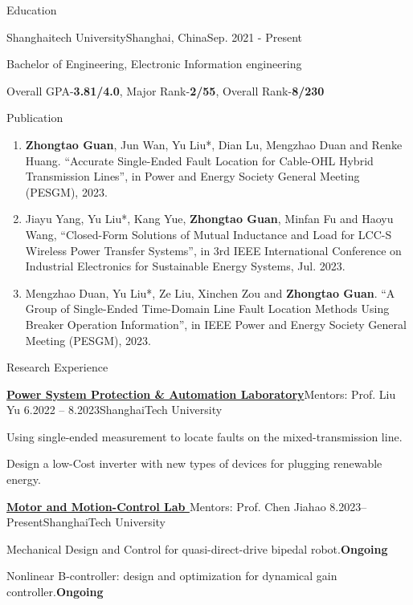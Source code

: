 \documentclass[]{ZhongtaoGuan-resume}
\begin{document}
\resumeheader
{}
{}
{}
{}
{}

\begin{section}{Education}
 \begin{subsectionnobullet}{Shanghaitech University}{Shanghai, China}{Sep. 2021 - Present}{}
     \item{Bachelor of Engineering, Electronic Information engineering}
     \item{Overall GPA-\textbf{3.81/4.0}, Major Rank-\textbf{2/55}, Overall Rank-\textbf{8/230}}
 \end{subsectionnobullet}
\end{section}

\begin{section}{Publication}
 \begin{enumerate}
     \item \textbf{Zhongtao Guan}, Jun Wan, Yu Liu*, Dian Lu, Mengzhao Duan and Renke Huang. “Accurate Single-Ended Fault Location for Cable-OHL Hybrid Transmission Lines”, in Power and Energy Society General Meeting (PESGM), 2023. %
     \item Jiayu Yang, Yu Liu*, Kang Yue, \textbf{Zhongtao Guan}, Minfan Fu and Haoyu Wang, “Closed-Form Solutions of Mutual Inductance and Load for LCC-S Wireless Power Transfer Systems”, in 3rd IEEE International Conference on Industrial Electronics for Sustainable Energy Systems, Jul. 2023.
     \item Mengzhao Duan, Yu Liu*, Ze Liu, Xinchen Zou and \textbf{Zhongtao Guan}. “A Group of Single-Ended Time-Domain Line Fault Location Methods Using Breaker Operation Information”, in IEEE Power and Energy Society General Meeting (PESGM), 2023.%
 \end{enumerate}
\end{section}

\begin{section}{Research Experience}
 \begin{subsection}{\textbf{\href{https://pspal.shanghaitech.edu.cn/}{Power System Protection \& Automation Laboratory}}}{Mentors: Prof. Liu Yu}{ 6.2022 -- 8.2023}{ShanghaiTech University}
     \item{Using single-ended measurement to locate faults on the mixed-transmission line.}
     \item{Design a low-Cost inverter with new types of devices for plugging renewable energy.}
 \end{subsection}
 
 \begin{subsection}{ \textbf{\href{https://faculty.sist.shanghaitech.edu.cn/chenjh/}{Motor and Motion-Control Lab }}}{Mentors: Prof. Chen Jiahao}{ 8.2023--Present}{ShanghaiTech University}
     \item{Mechanical Design and Control for quasi-direct-drive bipedal robot.}\hfill{\textbf{Ongoing}}
     \item{Nonlinear B-controller: design and optimization for dynamical gain controller.}\hfill{\textbf{Ongoing}}
 \end{subsection}
\end{section}
\end{document}
